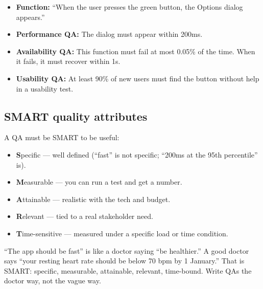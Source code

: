 \documentclass[a4paper,11pt]{article}
\begin{document}
\begin{itemize}
  \item \textbf{Function:} ``When the user presses the green button,
        the Options dialog appears.''
  \item \textbf{Performance QA:} The dialog must appear within 200ms.
  \item \textbf{Availability QA:} This function must fail at most
        0.05\% of the time. When it fails, it must recover within 1s.
  \item \textbf{Usability QA:} At least 90\% of new users must find
        the button without help in a usability test.
\end{itemize}

\subsection{SMART quality attributes}

A QA must be SMART to be useful:

\begin{itemize}
  \item \textbf{S}pecific — well defined (``fast'' is not specific;
        ``200ms at the 95th percentile'' is).
  \item \textbf{M}easurable — you can run a test and get a number.
  \item \textbf{A}ttainable — realistic with the tech and budget.
  \item \textbf{R}elevant — tied to a real stakeholder need.
  \item \textbf{T}ime-sensitive — measured under a specific load or time
        condition.
\end{itemize}

\begin{everyday}
``The app should be fast'' is like a doctor saying ``be healthier.''
A good doctor says ``your resting heart rate should be below 70 bpm
by 1 January.'' That is SMART: specific, measurable, attainable,
relevant, time-bound. Write QAs the doctor way, not the vague way.
\end{everyday}
\end{document}

